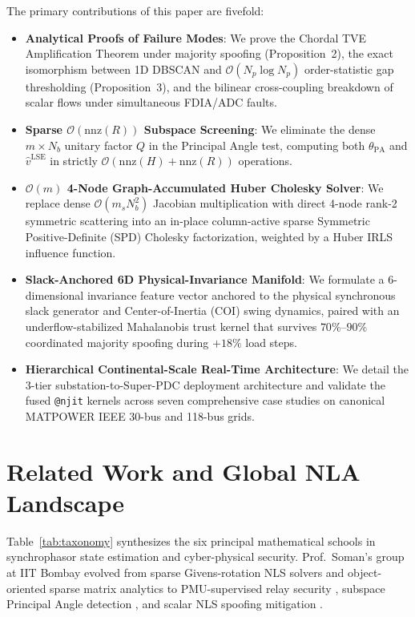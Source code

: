 \documentclass[journal,twoside]{IEEEtran}
\begin{document}
The primary contributions of this paper are fivefold:
\begin{itemize}
    \item \textbf{Analytical Proofs of Failure Modes}: We prove the Chordal TVE Amplification Theorem under majority spoofing (Proposition~2), the exact isomorphism between 1D DBSCAN and $\mathcal{O}(N_p \log N_p)$ order-statistic gap thresholding (Proposition~3), and the bilinear cross-coupling breakdown of scalar flows under simultaneous FDIA/ADC faults.
    \item \textbf{Sparse $\mathcal{O}(\mathrm{nnz}(R))$ Subspace Screening}: We eliminate the dense $m \times N_b$ unitary factor $Q$ in the Principal Angle test, computing both $\theta_{\mathrm{PA}}$ and $\hat{v}^{\mathrm{LSE}}$ in strictly $\mathcal{O}(\mathrm{nnz}(H) + \mathrm{nnz}(R))$ operations.
    \item \textbf{$\mathcal{O}(m)$ 4-Node Graph-Accumulated Huber Cholesky Solver}: We replace dense $\mathcal{O}(m_s N_b^2)$ Jacobian multiplication with direct 4-node rank-2 symmetric scattering into an in-place column-active sparse Symmetric Positive-Definite (SPD) Cholesky factorization, weighted by a Huber IRLS influence function.
    \item \textbf{Slack-Anchored 6D Physical-Invariance Manifold}: We formulate a 6-dimensional invariance feature vector anchored to the physical synchronous slack generator and Center-of-Inertia (COI) swing dynamics, paired with an underflow-stabilized Mahalanobis trust kernel that survives $70\%\text{--}90\%$ coordinated majority spoofing during $+18\%$ load steps.
    \item \textbf{Hierarchical Continental-Scale Real-Time Architecture}: We detail the 3-tier substation-to-Super-PDC deployment architecture and validate the fused \texttt{@njit} kernels across seven comprehensive case studies on canonical MATPOWER IEEE 30-bus and 118-bus grids.
\end{itemize}

\section{Related Work and Global NLA Landscape}
Table~\ref{tab:taxonomy} synthesizes the six principal mathematical schools in synchrophasor state estimation and cyber-physical security. Prof.~Soman's group at IIT Bombay evolved from sparse Givens-rotation NLS solvers \cite{pandian1999towards} and object-oriented sparse matrix analytics \cite{soman2002computational} to PMU-supervised relay security \cite{minal2019pmu,minal2020realtime}, subspace Principal Angle detection \cite{raju2023mitigation}, and scalar NLS spoofing mitigation \cite{badugu2026synchrophasor}.
\end{document}
